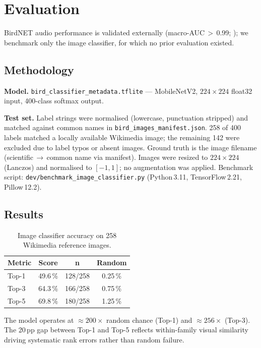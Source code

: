 \section{Evaluation}
\label{sec:eval}

BirdNET audio performance is validated externally (macro-AUC\,$>$\,0.99;
\cite{BirdNET2021}); we benchmark only the image classifier, for which no
prior evaluation existed.

\subsection{Methodology}

\textbf{Model.} \texttt{bird\_classifier\_metadata.tflite} — MobileNetV2,
$224{\times}224$ float32 input, 400-class softmax output.

\textbf{Test set.} Label strings were normalised (lowercase, punctuation stripped)
and matched against common names in \texttt{bird\_images\_manifest.json}.
258 of 400 labels matched a locally available Wikimedia image; the remaining 142
were excluded due to label typos or absent images.
Ground truth is the image filename (scientific\,$\to$\,common name via manifest).
Images were resized to $224{\times}224$ (Lanczos) and normalised to $[-1,1]$;
no augmentation was applied.
Benchmark script: \texttt{dev/benchmark\_image\_classifier.py}
(Python\,3.11, TensorFlow\,2.21, Pillow\,12.2).

\subsection{Results}

\begin{table}[htb]
\centering
\small
\begin{tabular}{lccc}
\hline
\textbf{Metric} & \textbf{Score} & \textbf{n} & \textbf{Random} \\
\hline
Top-1 & 49.6\,\% & 128/258 & 0.25\,\% \\
Top-3 & 64.3\,\% & 166/258 & 0.75\,\% \\
Top-5 & 69.8\,\% & 180/258 & 1.25\,\% \\
\hline
\end{tabular}
\caption{Image classifier accuracy on 258 Wikimedia reference images.}
\label{tab:accuracy}
\end{table}

The model operates at ${\approx}200{\times}$ random chance (Top-1) and
${\approx}256{\times}$ (Top-3).
The 20\,pp gap between Top-1 and Top-5 reflects within-family visual
similarity driving systematic rank errors rather than random failure.

